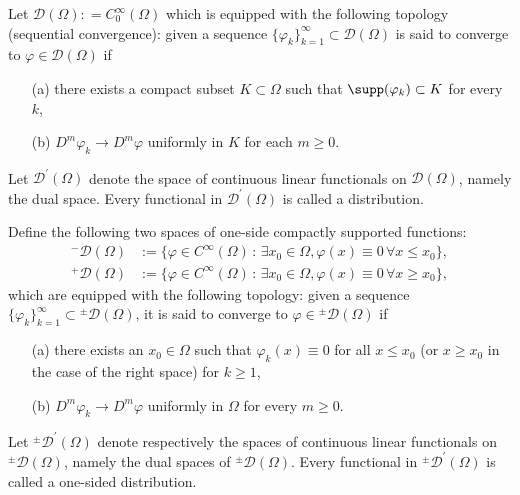 \documentclass[leqno,final]{siamltex}
\numberwithin{equation}{section}
\renewcommand{\(}{\bigl(}
\renewcommand{\)}{\bigr)}
\begin{document}
    \begin{definition}
        Let $\mathscr{D}(\Omega): =C^{\infty}_{0}(\Omega)$ which is equipped with the following 
        topology (sequential convergence): given a sequence $\{\varphi_k\}_{k=1}^{\infty} \subset \mathscr{D}(\Omega)$ is said to converge to $\varphi \in \mathscr{D}(\Omega)$ if 
        \begin{itemize}
            \item[(a)] there exists a compact subset $K\subset \Omega$ such that $\supp(\varphi_k) \subset K$ for every $k$,
            \item[(b)] $D^{m} \varphi_k \rightarrow D^{m}\varphi$ uniformly in $K$ for each $m\geq 0$.
        \end{itemize}
    Let $\mathscr{D}^{\prime}(\Omega)$ denote the space of continuous linear functionals on 
    $\mathscr{D}(\Omega)$, namely the dual space. 
    Every functional in $\mathscr{D}^{\prime} (\Omega)$ is called a distribution. 
    \end{definition}

    
    \begin{definition}
        Define the following two spaces of one-side compactly supported functions: 
        \begin{align*}
        {^{-}}{\mathscr{D}(\Omega)} &:= \{\varphi\in C^{\infty}(\Omega)\,:\, \exists x_0 \in \Omega, \varphi(x) \equiv 0 \, \forall x \leq x_0\}, \\
         {^{+}}{\mathscr{D}(\Omega)} &:= \{\varphi\in C^{\infty}(\Omega)\,:\, \exists x_0 \in \Omega, \varphi(x) \equiv 0 \, \forall x \geq x_0\},
         \end{align*} 
        which are equipped with the following topology: given a sequence $\{\varphi_k\}_{k=1}^{\infty} \subset {^{\pm}}{\mathscr{D}(\Omega)}$, it is said to converge to 
        $\varphi \in  {^{\pm}}{\mathscr{D}(\Omega)}$ if 
        \begin{itemize}
            \item[(a)] there exists an $x_0 \in \Omega$ such that $\varphi_k (x) \equiv 0$ for all 
            $x \leq x_0$ (or $x \geq x_0$ in the case of the right space) for  $k\geq  1$, 
            \item[(b)] $D^m \varphi_k \rightarrow D^m \varphi$ uniformly in $\Omega$ for every $m\geq 0$.
        \end{itemize}
    Let ${^{\pm}}{\mathscr{D}^{\prime}(\Omega)} $ denote respectively the spaces of continuous linear functionals on 
    ${^{\pm}}{\mathscr{D}(\Omega)}$,  namely the dual spaces of ${^{\pm}}{\mathscr{D}}(\Omega)$. 
    Every functional in ${^{\pm}}{\mathscr{D}^{\prime}}(\Omega) $ is called a one-sided distribution. 
    \end{definition} 
    
\end{document}
